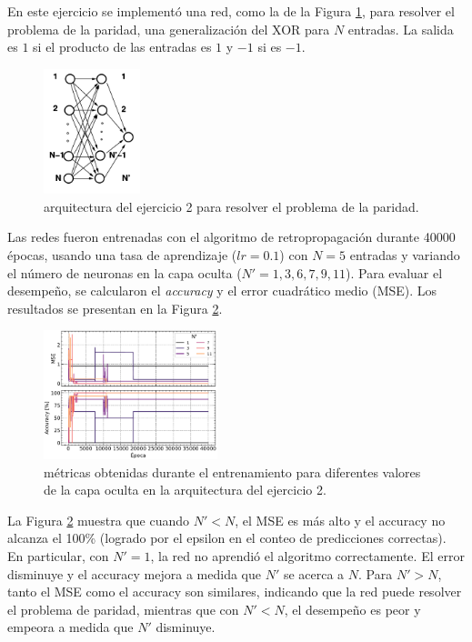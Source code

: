 \documentclass[11pt, twocolumn]{article}
\begin{document}
En este ejercicio se implementó una red, como la de la Figura \ref{fig:arquitectura_e2}, para resolver el problema de la paridad, una generalización del XOR para \(N\) entradas. La salida es \(1\) si el producto de las entradas es \(1\) y \(-1\) si es \(-1\).


\begin{figure} [htbp]
  \centering
  \includegraphics[width=0.25\textwidth]{figures/arquitectura e2.png}
  \caption{arquitectura del ejercicio 2 para resolver el problema de la paridad.}
  \label{fig:arquitectura_e2}
\end{figure}

Las redes fueron entrenadas con el algoritmo de retropropagación durante 40000 épocas, usando una tasa de aprendizaje (\(lr = 0.1\)) con \(N = 5\) entradas y variando el número de neuronas en la capa oculta (\(N' = 1, 3, 6, 7, 9, 11\)). Para evaluar el desempeño, se calcularon el \textit{accuracy} y el error cuadrático medio (MSE). Los resultados se presentan en la Figura \ref{fig:metrics_e2}.

\begin{figure} [htbp]
  \centering
  \includegraphics[width=0.45\textwidth]{figures/metrics_e2.pdf}
  \caption{métricas obtenidas durante el entrenamiento para diferentes valores de la capa oculta en la arquitectura del ejercicio 2.}
  \label{fig:metrics_e2}
\end{figure}

La Figura \ref{fig:metrics_e2} muestra que cuando \(N' < N\), el MSE es más alto y el accuracy no alcanza el 100\% (logrado por el epsilon en el conteo de predicciones correctas). En particular, con \(N' = 1\), la red no aprendió el algoritmo correctamente. El error disminuye y el accuracy mejora a medida que \(N'\) se acerca a \(N\). Para \(N' > N\), tanto el MSE como el accuracy son similares, indicando que la red puede resolver el problema de paridad, mientras que con \(N' < N\), el desempeño es peor y empeora a medida que \(N'\) disminuye.
\end{document}
